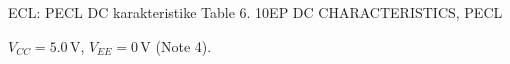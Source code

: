 \begin{frame}[label=10-s094]{ECL: PECL DC karakteristike}
\setlength{\abovedisplayskip}{4pt}\setlength{\belowdisplayskip}{4pt}\setlength{\abovedisplayshortskip}{3pt}\setlength{\belowdisplayshortskip}{3pt}
Table 6. 10EP DC CHARACTERISTICS, PECL\par
$V_{CC}=5.0\,\mathrm V$, $V_{EE}=0\,\mathrm V$ (Note 4).\par\smallskip

\end{frame}
